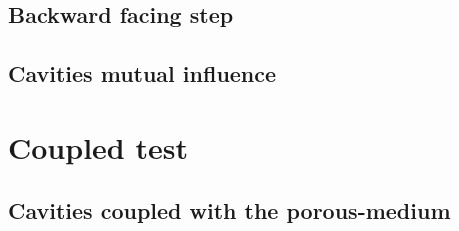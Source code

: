 \subsection{Backward facing step}
\subsection{Cavities mutual influence}
\section{Coupled test}
\subsection{Cavities coupled with the porous-medium}

